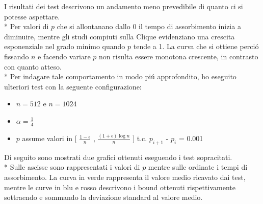 \documentclass[../Tesi.tex]{subfiles}
\begin{document}
I risultati dei test descrivono un andamento meno prevedibile di quanto ci si potesse aspettare.\\*
Per valori di $p$ che si allontanano dallo 0 il tempo di assorbimento inizia a diminuire, mentre gli studi compiuti sulla Clique \cite{DBLP:journals/corr/abs-2008-13589} evidenziano una crescita esponenziale nel grado minimo quando $p$ tende a 1. La curva che si ottiene perci\'o fissando $n$ e facendo variare $p$ non risulta essere monotona crescente, in contrasto con quanto atteso.\\*
Per indagare tale comportamento in modo pi\'u approfondito, ho eseguito ulteriori test con la seguente configurazione:
\begin{itemize}
    \item $n=512$ e $n=1024$
    \item $\alpha=\frac{1}{4}$
    \item $p$ assume valori in [ $\frac{1-\epsilon}{n}$ , $\frac{{(1+\epsilon)}\log{}n}{n}$ ] t.c. $p_{i+1}$ - $p_{i}$ = 0.001
\end{itemize}
Di seguito sono mostrati due grafici ottenuti eseguendo i test sopracitati.\\*
Sulle ascisse sono rappresentati i valori di $p$ mentre sulle ordinate i tempi di assorbimento. La curva in verde rappresenta il valore medio ricavato dai test, mentre le curve in blu e rosso descrivono i bound ottenuti rispettivamente sottraendo e sommando la deviazione standard al valore medio.
\end{document}
